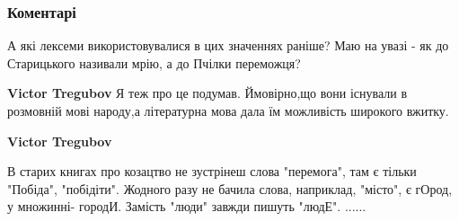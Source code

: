 
 
 
 
 
\subsubsection{Коментарі}
\label{sec:28_01_2020.fb.institut_prosvity.1.slovo_mrija_starickij.cmt}

\begin{itemize}
 

А які лексеми використовувалися в цих значеннях раніше? Маю на увазі - як до
Старицького називали мрію, а до Пчілки переможця?

\begin{itemize}
 
\textbf{Victor Tregubov} Я теж про це подумав. Ймовірно,що вони існували в розмовній мові народу,а літературна мова дала їм можливість широкого вжитку.

 
\textbf{Victor Tregubov} 

В старих книгах про козацтво не зустрінеш слова "перемога", там є тільки
"Побіда", "побідіти". Жодного разу не бачила слова, наприклад, "місто", є
гОрод, у множинні- городИ. Замість "люди" завжди пишуть "людЕ". ......


 

\end{itemize}
\end{itemize}
